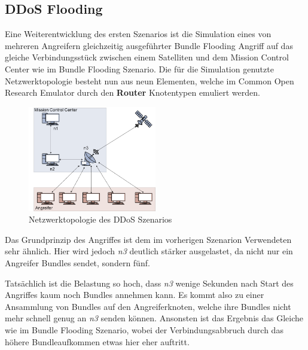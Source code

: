 \documentclass{article}
\begin{document}
\subsection{DDoS Flooding}
Eine Weiterentwicklung des ersten Szenarios ist die Simulation eines von mehreren Angreifern gleichzeitig ausgeführter Bundle Flooding Angriff auf das gleiche Verbindungsstück zwischen einem Satelliten und dem Mission Control Center wie im Bundle Flooding Szenario. Die für die Simulation genutzte Netzwerktopologie besteht nun aus neun Elementen, welche im Common Open Research Emulator durch den \textbf{Router} Knotentypen emuliert werden.\par
\begin{figure}[h]
\centering
\includegraphics[width=0.5\textwidth]{ddos}
\caption{Netzwerktopologie des DDoS Szenarios}
\end{figure}
Das Grundprinzip des Angriffes ist dem im vorherigen Szenarion Verwendeten sehr ähnlich. Hier wird jedoch \textit{n3} deutlich stärker ausgelastet, da nicht nur ein Angreifer Bundles sendet, sondern fünf. \par
Tatsächlich ist die Belastung so hoch, dass \textit{n3} wenige Sekunden nach Start des Angriffes kaum noch Bundles annehmen kann. Es kommt also zu einer Ansammlung von Bundles auf den Angreiferknoten, welche ihre Bundles nicht mehr schnell genug an \textit{n3} senden können. Ansonsten ist das Ergebnis das Gleiche wie im Bundle Flooding Szenario, wobei der Verbindungsabbruch durch das höhere Bundleaufkommen etwas hier eher auftritt.
\end{document}
